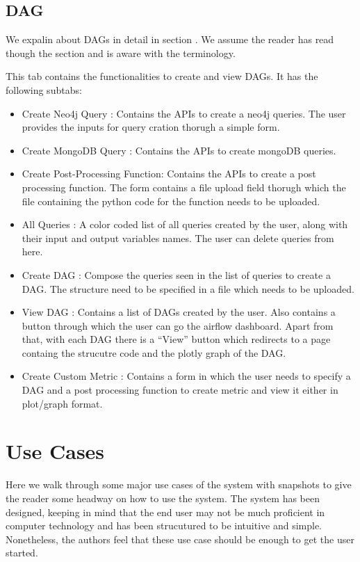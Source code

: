 \documentclass[letterpaper,10pt,english]{sphinxmanual}
\begin{document}
\subsection{DAG}
\label{\detokenize{dashboard_website:dag}}
We expalin about DAGs in detail in section {\hyperref[\detokenize{dag:composing-multiple-queries-dag}]{}}. We assume the reader has read though the section and is aware with the terminology.

This tab contains the functionalities to create and view DAGs. It has the following subtabs:
\begin{itemize}
\item {} 
Create Neo4j Query : Contains the APIs to create a neo4j queries. The user provides the inputs for query cration thorugh a simple form.

\item {} 
Create MongoDB Query : Contains the APIs to create mongoDB queries.

\item {} 
Create Post-Processing Function: Contains the APIs to create a post processing function. The form contains a file upload field thorugh which the file containing the python code for the function needs to be uploaded.

\item {} 
All Queries : A color coded list of all queries created by the user, along with their input and output variables names. The user can delete queries from here.

\item {} 
Create DAG : Compose the queries seen in the list of queries to create a DAG. The structure need to be specified in a file which needs to be uploaded.

\item {} 
View DAG : Contains a list of DAGs created by the user. Also contains a button through which the user can go the airflow dashboard. Apart from that, with each DAG there is a “View” button which redirects to a page containg the strucutre code and the plotly graph of the DAG.

\item {} 
Create Custom Metric : Contains a form in which the user needs to specify a DAG and a post processing function to create metric and view it either in plot/graph format.

\end{itemize}


\section{Use Cases}
\label{\detokenize{dashboard_website:use-cases}}
Here we walk through some major use cases of the system with snapshots to give the reader some headway on how to use the system. The system has been designed, keeping in mind that the end user may not be much proficient in computer technology and has been strucutured to be intuitive and simple. Nonetheless, the authors feel that these use case should be enough to get the user started.
\end{document}
